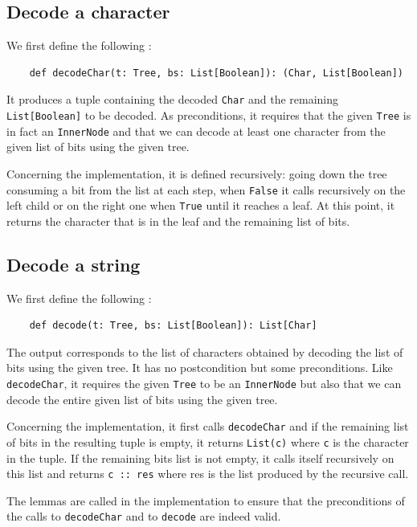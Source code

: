 \documentclass[a4paper,UKenglish,cleveref, autoref, thm-restate]{lipics-v2021}
\begin{document}
\subsection{Decode a character}
We first define the following :

\begin{lstlisting}
    def decodeChar(t: Tree, bs: List[Boolean]): (Char, List[Boolean])
\end{lstlisting}

It produces a tuple containing the decoded \lstinline{Char} and the remaining \lstinline{List[Boolean]} to be decoded.
As preconditions, it requires that the given \lstinline{Tree} is in fact an \lstinline{InnerNode} and that we can decode at least one character from the given list of bits using the given tree.

Concerning the implementation, it is defined recursively: going down the tree consuming a bit from the list at each step, when \lstinline{False} it calls recursively on the left child or on the right one when \lstinline{True} until it reaches a leaf. At this point,
it returns the character that is in the leaf and the remaining list of bits.

\subsection{Decode a string}
We first define the following :

\begin{lstlisting}
    def decode(t: Tree, bs: List[Boolean]): List[Char]
\end{lstlisting}

The output corresponds to the list of characters obtained by decoding the list of bits using the given tree.
It has no postcondition but some preconditions. Like \lstinline{decodeChar}, it requires the given \lstinline{Tree} to be an \lstinline{InnerNode} but also that we can decode the entire given list of bits using the given tree.

Concerning the implementation, it first calls \lstinline{decodeChar} and if the remaining list of bits in the resulting tuple is empty, it returns \lstinline{List(c)} where \lstinline{c} is the character in the tuple. If the remaining bits list is not empty,
it calls itself recursively on this list and returns \lstinline{c :: res} where res is the list produced by the recursive call.

The lemmas are called in the implementation to ensure that the preconditions of the calls to \lstinline{decodeChar} and to \lstinline{decode} are indeed valid.
\end{document}
